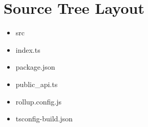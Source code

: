 \section{Source Tree Layout}


\begin{itemize}
  \item src
\end{itemize}


\begin{itemize}
  \item index.ts
  \item package.json
  \item public\_api.ts
  \item rollup.config.js
  \item tsconfig-build.json
\end{itemize}










